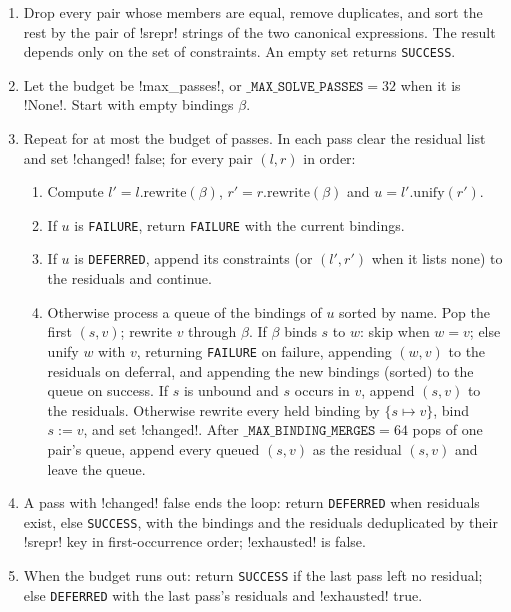 \begin{algorithm}\label{alg:algebra-solve}
\begin{enumerate}
\item Drop every pair whose members are equal, remove duplicates, and sort the rest by the pair of \py!srepr! strings of the two canonical expressions. The result depends only on the set of constraints. An empty set returns \texttt{SUCCESS}.
\item Let the budget be \py!max_passes!, or $\mathtt{\_MAX\_SOLVE\_PASSES}=32$ when it is \py!None!. Start with empty bindings $\beta$.
\item Repeat for at most the budget of passes. In each pass clear the residual list and set \code!changed! false; for every pair $(l,r)$ in order:
\begin{enumerate}
\item Compute $l'=l.\mathrm{rewrite}(\beta)$, $r'=r.\mathrm{rewrite}(\beta)$ and $u=l'.\mathrm{unify}(r')$.
\item If $u$ is \texttt{FAILURE}, return \texttt{FAILURE} with the current bindings.
\item If $u$ is \texttt{DEFERRED}, append its constraints (or $(l',r')$ when it lists none) to the residuals and continue.
\item Otherwise process a queue of the bindings of $u$ sorted by name. Pop the first $(s,v)$; rewrite $v$ through $\beta$. If $\beta$ binds $s$ to $w$: skip when $w=v$; else unify $w$ with $v$, returning \texttt{FAILURE} on failure, appending $(w,v)$ to the residuals on deferral, and appending the new bindings (sorted) to the queue on success. If $s$ is unbound and $s$ occurs in $v$, append $(s,v)$ to the residuals. Otherwise rewrite every held binding by $\{s\mapsto v\}$, bind $s:=v$, and set \code!changed!. After $\mathtt{\_MAX\_BINDING\_MERGES}=64$ pops of one pair's queue, append every queued $(s,v)$ as the residual $(s,v)$ and leave the queue.
\end{enumerate}
\item A pass with \code!changed! false ends the loop: return \texttt{DEFERRED} when residuals exist, else \texttt{SUCCESS}, with the bindings and the residuals deduplicated by their \py!srepr! key in first-occurrence order; \code!exhausted! is false.
\item When the budget runs out: return \texttt{SUCCESS} if the last pass left no residual; else \texttt{DEFERRED} with the last pass's residuals and \code!exhausted! true.
\end{enumerate}
\end{algorithm}

